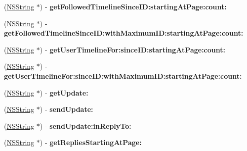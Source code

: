 \begin{DoxyCompactItemize}
\item 
\hypertarget{interface_m_g_twitter_engine_a8a40d534561bffabb34490c6e2dcc85e}{
(\hyperlink{class_n_s_string}{\-N\-S\-String} $\ast$) -\/ {\bfseries get\-Followed\-Timeline\-Since\-I\-D\-:starting\-At\-Page\-:count\-:}}
\label{interface_m_g_twitter_engine_a8a40d534561bffabb34490c6e2dcc85e}

\item 
\hypertarget{interface_m_g_twitter_engine_a34c0ba6dea70bb23981e638c04892298}{
(\hyperlink{class_n_s_string}{\-N\-S\-String} $\ast$) -\/ {\bfseries get\-Followed\-Timeline\-Since\-I\-D\-:with\-Maximum\-I\-D\-:starting\-At\-Page\-:count\-:}}
\label{interface_m_g_twitter_engine_a34c0ba6dea70bb23981e638c04892298}

\item 
\hypertarget{interface_m_g_twitter_engine_a54684be9ec4e9eedf6e501824b986b20}{
(\hyperlink{class_n_s_string}{\-N\-S\-String} $\ast$) -\/ {\bfseries get\-User\-Timeline\-For\-:since\-I\-D\-:starting\-At\-Page\-:count\-:}}
\label{interface_m_g_twitter_engine_a54684be9ec4e9eedf6e501824b986b20}

\item 
\hypertarget{interface_m_g_twitter_engine_abc3afd27a25718d85c971168a395917e}{
(\hyperlink{class_n_s_string}{\-N\-S\-String} $\ast$) -\/ {\bfseries get\-User\-Timeline\-For\-:since\-I\-D\-:with\-Maximum\-I\-D\-:starting\-At\-Page\-:count\-:}}
\label{interface_m_g_twitter_engine_abc3afd27a25718d85c971168a395917e}

\item 
\hypertarget{interface_m_g_twitter_engine_a6e76154597c9aa014d2312e3ffbc191a}{
(\hyperlink{class_n_s_string}{\-N\-S\-String} $\ast$) -\/ {\bfseries get\-Update\-:}}
\label{interface_m_g_twitter_engine_a6e76154597c9aa014d2312e3ffbc191a}

\item 
\hypertarget{interface_m_g_twitter_engine_afec750c02977315eb3e938aacadcb6cd}{
(\hyperlink{class_n_s_string}{\-N\-S\-String} $\ast$) -\/ {\bfseries send\-Update\-:}}
\label{interface_m_g_twitter_engine_afec750c02977315eb3e938aacadcb6cd}

\item 
\hypertarget{interface_m_g_twitter_engine_a2b93cebbb4800a9b57cd9917e67a08e5}{
(\hyperlink{class_n_s_string}{\-N\-S\-String} $\ast$) -\/ {\bfseries send\-Update\-:in\-Reply\-To\-:}}
\label{interface_m_g_twitter_engine_a2b93cebbb4800a9b57cd9917e67a08e5}

\item 
\hypertarget{interface_m_g_twitter_engine_a2a34493b9e5aaae1e50eadfc2d250cd7}{
(\hyperlink{class_n_s_string}{\-N\-S\-String} $\ast$) -\/ {\bfseries get\-Replies\-Starting\-At\-Page\-:}}
\label{interface_m_g_twitter_engine_a2a34493b9e5aaae1e50eadfc2d250cd7}


\end{DoxyCompactItemize}

